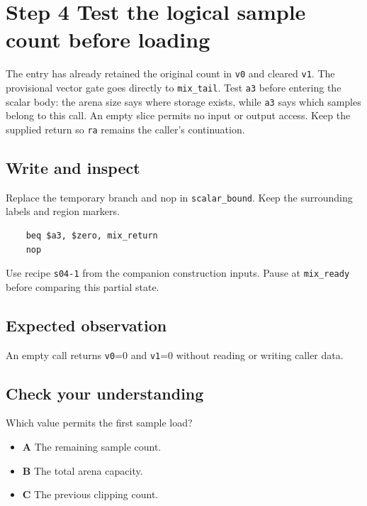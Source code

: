 \section{Step 4 Test the logical sample count before loading}\label{pcm-s04}

The entry has already retained the original count in \texttt{v0} and cleared \texttt{v1}. The provisional vector gate goes directly to \texttt{mix\_tail}. Test \texttt{a3} before entering the scalar body: the arena size says where storage exists, while \texttt{a3} says which samples belong to this call. An empty slice permits no input or output access. Keep the supplied return so \texttt{ra} remains the caller’s continuation.

\subsection{Write and inspect}
Replace the temporary branch and nop in \texttt{scalar\_bound}. Keep the surrounding labels and region markers.

\begin{verbatim}
    beq $a3, $zero, mix_return
    nop
\end{verbatim}
Use recipe \texttt{s04-1} from the companion construction inputs. Pause at \texttt{mix\_ready} before comparing this partial state.

\subsection{Expected observation}
An empty call returns \texttt{v0}=0 and \texttt{v1}=0 without reading or writing caller data.

\subsection{Check your understanding}
Which value permits the first sample load?

\begin{itemize}
  \item \textbf{A} The remaining sample count.
  \item \textbf{B} The total arena capacity.
  \item \textbf{C} The previous clipping count.
\end{itemize}
